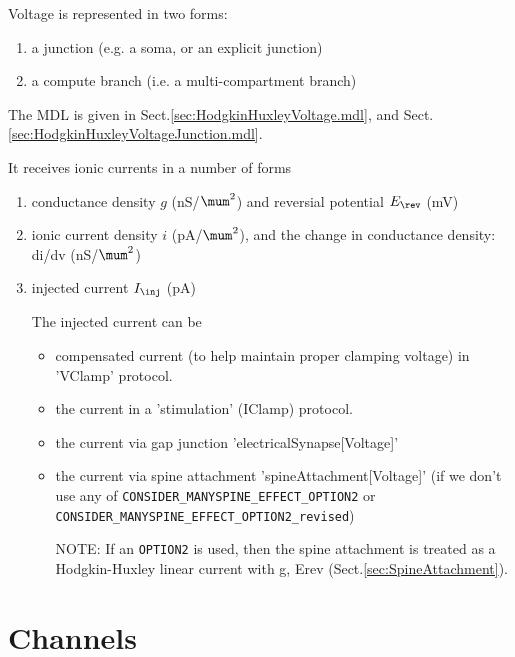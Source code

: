 Voltage is represented in two forms:
\begin{enumerate}
  \item a junction (e.g. a soma, or an explicit junction)
  
  \item a compute branch (i.e. a multi-compartment branch)
\end{enumerate}
The MDL is given in Sect.\ref{sec:HodgkinHuxleyVoltage.mdl}, and 
Sect.\ref{sec:HodgkinHuxleyVoltageJunction.mdl}.

It receives ionic currents in a number of forms

\begin{enumerate}
  \item conductance density $g$ (nS/$\mum^2$) and reversial potential $E_\rev$
  (mV)
  
  \item ionic current density $i$ (pA/$\mum^2$), and the change in conductance
  density:
  di/dv (nS/$\mum^2$)
  
  \item injected current $I_\inj$ (pA)

The injected current can be 
\begin{itemize}
  \item compensated current (to help maintain proper clamping voltage) in
  'VClamp' protocol.
  
  
  \item the current in a 'stimulation' (IClamp) protocol.
  
  
  \item the current via gap junction 'electricalSynapse[Voltage]'  
  
  \item the current via spine attachment 'spineAttachment[Voltage]'
  (if we don't use any of \verb!CONSIDER_MANYSPINE_EFFECT_OPTION2! or
  \verb!CONSIDER_MANYSPINE_EFFECT_OPTION2_revised!)
  
NOTE: If an \verb!OPTION2! is used, then the spine attachment is treated as a
Hodgkin-Huxley linear current with g, Erev (Sect.\ref{sec:SpineAttachment}).

  
\end{itemize}
\end{enumerate}




\section{Channels}
\label{sec:NTS-Channels}

